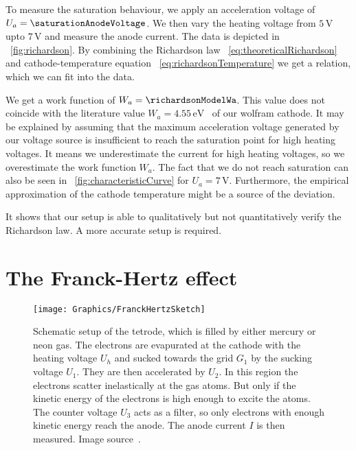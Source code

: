 \documentclass[a4paper,10pt,twocolumn]{article}
\newcommand{\wolframWa}{4.55\, \mathrm{eV}}
\newcommand{\volt}{\, \mathrm{V}}
\newcommand{\sevenV}{7 \volt}
\begin{document}
    To measure the saturation behaviour, we apply an acceleration 
    voltage of $U_a = \saturationAnodeVoltage$.
    We then vary the heating voltage from $5 \volt$ upto $7 \volt$ and measure the anode current.
    The data is depicted in ~\autoref{fig:richardson}.
    By combining the Richardson law ~\eqref{eq:theoreticalRichardson} and 
    cathode-temperature equation ~\eqref{eq:richardsonTemperature} we get a relation,
    which we can fit into the data.
    
    We get a work function of $W_a = \richardsonModelWa$.
    This value does not coincide with the literature value $W_a = \wolframWa$~\cite{wolfram} of our wolfram cathode.
    It may be explained by assuming that the maximum acceleration voltage generated by our voltage source is
    insufficient to reach the saturation point for high heating voltages.
    It means we underestimate the current for high heating voltages, so we overestimate the work function $W_a$.
    The fact that we do not reach saturation can also be seen in ~\autoref{fig:characteristicCurve} for $U_a = \sevenV$.
    Furthermore, the empirical approximation of the cathode temperature might be a source of the deviation.
    
    It shows that our setup is able to qualitatively but not quantitatively verify the Richardson law.
    A more accurate setup is required.
    
    \section{The Franck-Hertz effect}

    \begin{figure}[htbp]
        \texttt{[image: Graphics/FranckHertzSketch]}
        \center
        \caption{Schematic setup of the tetrode, which is filled by either mercury or neon gas.
        The electrons are evapurated at the cathode with the heating voltage $U_h$ and sucked towards
        the grid $G_1$ by the sucking voltage $U_1$.
        They are then accelerated by $U_2$.
        In this region the electrons scatter inelastically at the gas atoms. 
        But only if the kinetic energy of the electrons is high enough to excite the atoms.
        The counter voltage $U_3$ acts as a filter, so only electrons with enough kinetic energy reach
        the anode.
        The anode current $I$ is then measured.
        Image source~\cite{frankHertzSource}.
        }
        \label{fig:franckHertzSketch}
    \end{figure}
    
\end{document}
